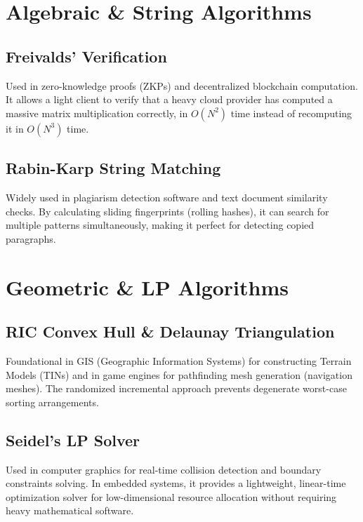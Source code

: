 \documentclass[twoside,12pt]{book}
\theoremstyle{plain}
\theoremstyle{definition}
\theoremstyle{remark}
\begin{document}
\section{Algebraic \& String Algorithms}

\subsection{Freivalds' Verification}
Used in zero-knowledge proofs (ZKPs) and decentralized blockchain computation. It allows 
a light client to verify that a heavy cloud provider has computed a massive matrix 
multiplication correctly, in $O(N^2)$ time instead of recomputing it in $O(N^3)$ time.

\subsection{Rabin-Karp String Matching}
Widely used in plagiarism detection software and text document similarity checks. By 
calculating sliding fingerprints (rolling hashes), it can search for multiple patterns 
simultaneously, making it perfect for detecting copied paragraphs.

\section{Geometric \& LP Algorithms}

\subsection{RIC Convex Hull \& Delaunay Triangulation}
Foundational in GIS (Geographic Information Systems) for constructing Terrain Models 
(TINs) and in game engines for pathfinding mesh generation (navigation meshes). The 
randomized incremental approach prevents degenerate worst-case sorting arrangements.

\subsection{Seidel's LP Solver}
Used in computer graphics for real-time collision detection and boundary constraints 
solving. In embedded systems, it provides a lightweight, linear-time optimization 
solver for low-dimensional resource allocation without requiring heavy mathematical software.
\end{document}
